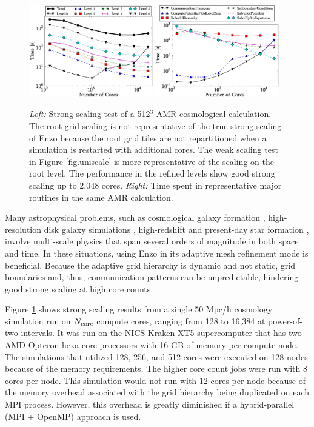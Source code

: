 \begin{figure}
\begin{center}
\includegraphics[width=0.48\textwidth]{figures/strong_scaling_levels.eps}
\hfill
\includegraphics[width=0.48\textwidth]{figures/strong_scaling_routines.eps}
\end{center}
\caption{\emph{Left:} Strong scaling test of a 512$^3$ AMR
  cosmological calculation.  The root grid scaling is not
  representative of the true strong scaling of Enzo because the root
  grid tiles are not repartitioned when a simulation is restarted with
  additional cores.  The weak scaling test in Figure
  \ref{fig.uniscale} is more representative of the scaling on the root
  level.  The performance in the refined levels show good strong
  scaling up to 2,048 cores.  \emph{Right:} Time spent in
  representative major routines in the same AMR calculation.}
\label{fig:strong_scaling}
\end{figure}

Many astrophysical problems, such as cosmological galaxy formation
\citep{}, high-resolution disk galaxy simulations \citep{},
high-redshift \citep{} and present-day star formation \citep{},
involve multi-scale physics that span several orders of magnitude in
both space and time.  In these situations, using Enzo in its adaptive
mesh refinement mode is beneficial.  Because the adaptive grid
hierarchy is dynamic and not static, grid boundaries and, thus,
communication patterns can be unpredictable, hindering good strong
scaling at high core counts.

Figure \ref{fig:strong_scaling} shows strong scaling results from a
single 50 Mpc/h cosmology simulation run on $N_{\rm core}$ compute
cores, ranging from 128 to 16,384 at power-of-two intervals.  It was
run on the NICS Kraken XT5 supercomputer that has two AMD Opteron
hexa-core processors with 16 GB of memory per compute node.  The
simulations that utilized 128, 256, and 512 cores were executed on 128
nodes because of the memory requirements.  The higher core count jobs
were run with 8 cores per node.  This simulation would not run with 12
cores per node because of the memory overhead associated with the grid
hierarchy being duplicated on each MPI process.  However, this
overhead is greatly diminished if a hybrid-parallel (MPI + OpenMP)
approach is used.

